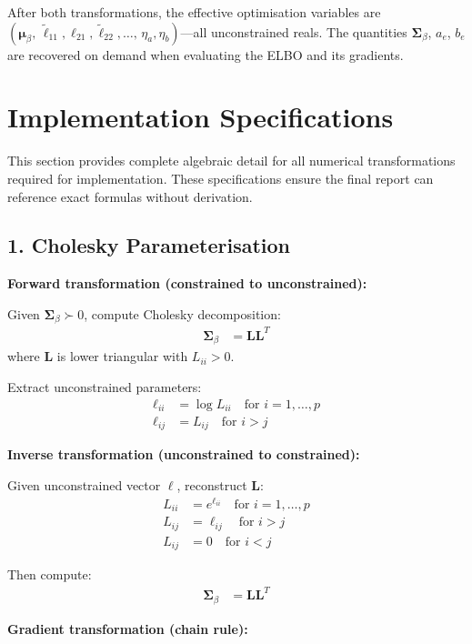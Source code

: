 \documentclass[11pt]{article}
\begin{document}
After both transformations, the effective optimisation variables are $(\bm{\mu}_\beta,\, \tilde{\ell}_{11}, \ell_{21}, \tilde{\ell}_{22}, \ldots,\, \eta_a, \eta_b)$---all unconstrained reals. The quantities $\bm{\Sigma}_\beta$, $a_e$, $b_e$ are recovered on demand when evaluating the ELBO and its gradients.

\newpage
\section*{Implementation Specifications}

This section provides complete algebraic detail for all numerical transformations required for implementation. These specifications ensure the final report can reference exact formulas without derivation.

\subsection*{1. Cholesky Parameterisation}

\textbf{Forward transformation (constrained to unconstrained):}

Given $\bm{\Sigma}_\beta \succ 0$, compute Cholesky decomposition:
\begin{align}
\bm{\Sigma}_\beta &= \bm{L}\bm{L}^T
\end{align}
where $\bm{L}$ is lower triangular with $L_{ii} > 0$.

Extract unconstrained parameters:
\begin{align}
\ell_{ii} &= \log L_{ii} \quad \text{for } i=1,\ldots,p\\
\ell_{ij} &= L_{ij} \quad \text{for } i > j
\end{align}

\textbf{Inverse transformation (unconstrained to constrained):}

Given unconstrained vector $\bm{\ell}$, reconstruct $\bm{L}$:
\begin{align}
L_{ii} &= e^{\ell_{ii}} \quad \text{for } i=1,\ldots,p\\
L_{ij} &= \ell_{ij} \quad \text{for } i > j\\
L_{ij} &= 0 \quad \text{for } i < j
\end{align}

Then compute:
\begin{align}
\bm{\Sigma}_\beta &= \bm{L}\bm{L}^T
\end{align}

\textbf{Gradient transformation (chain rule):}
\end{document}
